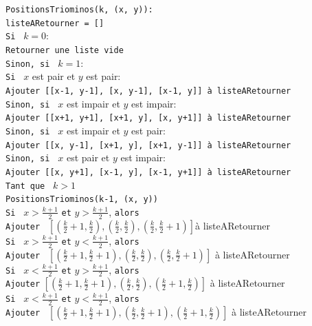 \documentclass[16pt]{report}
\begin{document}
\begin{multicols*}{2}
\begin{enumerate}
\texttt{PositionsTriominos(k, (x, y)):} \\
    \quad \texttt{listeARetourner = []} \\
    \quad \texttt{Si } \( k = 0 \): \\
    \quad \quad \texttt{Retourner une liste vide} \\
    \quad \texttt{Sinon, si } \( k = 1 \): \\
    \quad \quad \texttt{Si } \( x \) est pair et \( y \) est pair: \\
    \quad \quad \quad \texttt{Ajouter [[x-1, y-1], [x, y-1], [x-1, y]] à listeARetourner} \\
    \quad \quad \texttt{Sinon, si } \( x \) est impair et \( y \) est impair: \\
    \quad \quad \quad \texttt{Ajouter [[x+1, y+1], [x+1, y], [x, y+1]] à listeARetourner} \\
    \quad \texttt{Sinon, si } \( x \) est impair et \( y \) est pair: \\
    \quad \quad \texttt{Ajouter [[x, y-1], [x+1, y], [x+1, y-1]] à listeARetourner} \\
    \quad \texttt{Sinon, si } \( x \) est pair et \( y \) est impair: \\
    \quad \quad \texttt{Ajouter [[x, y+1], [x-1, y], [x-1, y+1]] à listeARetourner} \\
    \quad \texttt{Tant que } \( k > 1 \) \\
    \quad \quad \texttt{PositionsTriominos(k-1, (x, y))} \\
    \quad \texttt{Si } \( x > \frac{k+1}{2} \) \texttt{et} \( y > \frac{k+1}{2} \), \texttt{alors} \\
    \quad \quad \texttt{Ajouter } \(\left[ \left(\frac{k}{2}+1, \frac{k}{2}\right), \left(\frac{k}{2}, \frac{k}{2}\right), \left(\frac{k}{2}, \frac{k}{2}+1\right) \right]\){à listeARetourner} \\
    \quad \texttt{Si } \( x > \frac{k+1}{2} \) \texttt{et} \( y < \frac{k+1}{2} \), \texttt{alors} \\
    \quad \quad \texttt{Ajouter } \(\left[ \left(\frac{k}{2}+1, \frac{k}{2}+1\right), \left(\frac{k}{2}, \frac{k}{2}\right), \left(\frac{k}{2}, \frac{k}{2}+1\right) \right]\) {à listeARetourner}\\
    \quad \texttt{Si } \( x < \frac{k+1}{2} \) \texttt{et} \( y > \frac{k+1}{2} \), \texttt{alors} \\
    \quad \quad \texttt{Ajouter} \(\left[ \left(\frac{k}{2}+1, \frac{k}{2}+1\right), \left(\frac{k}{2}, \frac{k}{2}\right), \left(\frac{k}{2}+1, \frac{k}{2}\right) \right]\) {à listeARetourner} \\
    \quad \texttt{Si } \( x < \frac{k+1}{2} \) \texttt{et} \( y < \frac{k+1}{2} \), \texttt{alors} \\
    \quad \quad \texttt{Ajouter } \(\left[ \left(\frac{k}{2}+1, \frac{k}{2}+1\right), \left(\frac{k}{2}, \frac{k}{2}+1\right), \left(\frac{k}{2}+1, \frac{k}{2}\right) \right]\) {à listeARetourner}


\end{enumerate}
\end{multicols*}
\end{document}
